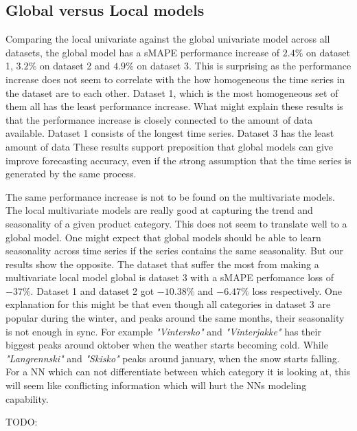 

\subsection{Global versus Local models}
Comparing the local univariate against the global univariate model across all datasets,
the global model has a sMAPE performance increase of $2.4\%$ on dataset 1, $3.2\%$ on dataset 2 and
$4.9\%$ on dataset 3. This is surprising as the performance increase does not seem to correlate
with the how homogeneous the time series in the dataset are to each other.
Dataset 1, which is the most homogeneous set of them all has the least performance increase.
What might explain these results is that the performance increase is closely connected to the amount
of data available. Dataset 1 consists of the longest time series.
Dataset 3 has the least amount of data
These results support \cite[]{Montero-Manso2021} preposition that global models can give
improve forecasting accuracy, even if the strong assumption that the time series
is generated by the same process.

The same performance increase is not to be found on the multivariate models.
The local multivariate models are really good at capturing the trend and seasonality of
a given product category. This does not seem to translate well to a global model.
One might expect that global models should be able to learn seasonality across
time series if the series contains the same seasonality. But our results show the opposite.
The dataset that suffer the most from making a multivariate local model global is dataset 3
with a sMAPE perfomance loss of $-37\%$. Dataset 1 and dataset 2 got $-10.38\%$ and $-6.47\%$ loss
respectively.
One explanation for this might be that even though all categories in dataset 3 are popular during the
winter, and peaks around the same months, their seasonality is not enough in sync.
For example \textit{"Vintersko"} and \textit{"Vinterjakke"} has their biggest peaks around oktober
when the weather starts becoming cold. While \textit{"Langrennski"} and \textit{"Skisko"}
peaks around january, when the snow starts falling. For a NN which can not differentiate between
which category it is looking at, this will seem like conflicting information which will
hurt the NNs modeling capability.



TODO:
%

